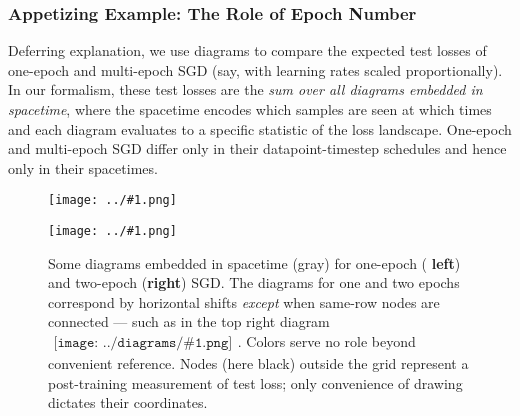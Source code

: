 \documentclass{article}
\newcommand{\plotmooh}[3]{
    \texttt{[image: ../\#1.png]}
}
\newcommand{\sdia}[1]{\begin{gathered}\texttt{[image: ../diagrams/\#1.png]}\end{gathered}}
\begin{document}
    \subsubsection*{Appetizing Example: The Role of Epoch Number}
        Deferring explanation, we use diagrams to compare the
        expected test losses of one-epoch and multi-epoch SGD (say, with
        learning rates scaled proportionally).  In our formalism,
        these test losses are the \emph{sum over all diagrams embedded in
        spacetime}, where the spacetime encodes which samples are seen at
        which times
        and each diagram evaluates to a specific statistic of the loss
        landscape.  One-epoch and multi-epoch SGD differ only in their
        datapoint-timestep schedules and hence only in their spacetimes. 

        \begin{figure}[h!] \label{fig:epoch}
            \centering  
            \plotmooh{diagrams/spacetime-c}{0.32\columnwidth}{0.32\columnwidth}
            \plotmooh{diagrams/spacetime-d}{0.64\columnwidth}{0.32\columnwidth}
            \caption{
                Some diagrams embedded in spacetime (gray) for one-epoch ({\bf
                left}) and two-epoch ({\bf right}) SGD.  The diagrams for one
                and two epochs correspond by horizontal shifts \emph{except}
                when same-row nodes are connected --- such as in the top right
                diagram $\sdia{c(01-2)(01-12)}$.  Colors serve no role beyond
                convenient reference.  Nodes (here black) outside the grid
                represent a post-training measurement of test loss; only
                convenience of drawing dictates their coordinates.
            }
        \end{figure}
\end{document}
